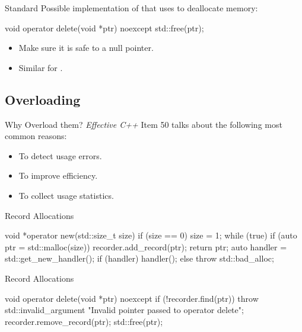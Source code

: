 \documentclass{beamer}
\begin{document}
\begin{frame}[fragile]{Standard }
  Possible implementation of  that uses  to deallocate memory:
  \begin{cpp}
void operator delete(void *ptr) noexcept {
  std::free(ptr);
}
  \end{cpp}
  \begin{itemize}
    \item Make sure it is safe to  a null pointer.
    \item Similar for .
  \end{itemize}
\end{frame}

\subsection{Overloading}

\begin{frame}{Why Overload them?}
  \textit{Effective C++} Item 50 talks about the following most common reasons:
  \begin{itemize}
    \item To detect usage errors.
    \item To improve efficiency.
    \item To collect usage statistics.
  \end{itemize}
\end{frame}

\begin{frame}[fragile]{Record Allocations}
  \begin{cpp}
void *operator new(std::size_t size) {
  if (size == 0)
    size = 1;
  while (true) {
    if (auto ptr = std::malloc(size)) {
      recorder.add_record(ptr);
      return ptr;
    }
    auto handler = std::get_new_handler();
    if (handler)
      handler();
    else
      throw std::bad_alloc{};
  }
}
  \end{cpp}
\end{frame}

\begin{frame}[fragile]{Record Allocations}
  \begin{cpp}
void operator delete(void *ptr) noexcept {
  if (!recorder.find(ptr))
    throw std::invalid_argument
        {"Invalid pointer passed to operator delete"};
  recorder.remove_record(ptr);
  std::free(ptr);
}
  \end{cpp}
\end{frame}
\end{document}
